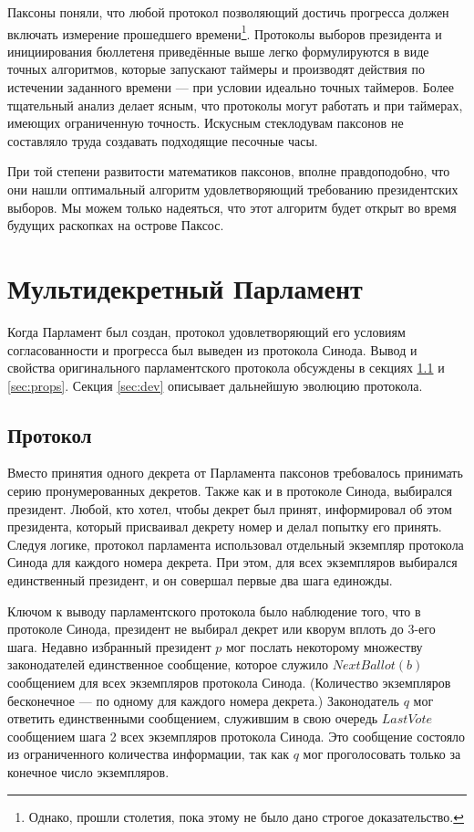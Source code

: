 \documentclass[12pt, a4paper]{article} %
\begin{document}
Паксоны поняли, что любой протокол позволяющий достичь прогресса должен включать измерение прошедшего времени\footnote{Однако, прошли столетия, пока этому не было дано строгое доказательство.}. Протоколы выборов президента и инициирования бюллетеня приведённые выше легко формулируются в виде точных алгоритмов, которые запускают таймеры и производят действия по истечении заданного времени --- при условии идеально точных таймеров. Более тщательный анализ делает ясным, что протоколы могут работать и при таймерах, имеющих ограниченную точность. Искусным стеклодувам паксонов не составляло труда создавать подходящие песочные часы. 

При той степени развитости математиков паксонов, вполне правдоподобно, что они нашли оптимальный алгоритм удовлетворяющий требованию президентских выборов. Мы можем только надеяться, что этот алгоритм будет открыт во время будущих раскопках на острове Паксос.

\newpage
\section{Мультидекретный Парламент}\label{sec:parlamentprot}

Когда Парламент был создан, протокол удовлетворяющий его условиям согласованности и прогресса был выведен из протокола Синода. Вывод и свойства оригинального парламентского протокола обсуждены в секциях \ref{sec:protocol} и \ref{sec:props}. Секция \ref{sec:dev} описывает дальнейшую эволюцию протокола.

\subsection{Протокол}\label{sec:protocol}

Вместо принятия одного декрета от Парламента паксонов требовалось принимать серию пронумерованных декретов. Также как и в протоколе Синода, выбирался президент. Любой, кто хотел, чтобы декрет был принят, информировал об этом президента, который присваивал декрету номер и делал попытку его принять. Следуя логике, протокол парламента использовал отдельный экземпляр протокола Синода для каждого номера декрета. При этом, для всех экземпляров выбирался единственный президент, и он совершал первые два шага единожды.

Ключом к выводу парламентского протокола было наблюдение того, что в протоколе Синода, президент не выбирал декрет или кворум вплоть до 3-его шага. Недавно избранный президент $p$ мог послать некоторому множеству законодателей единственное сообщение, которое служило $NextBallot(b)$ сообщением для всех экземпляров протокола Синода. (Количество экземпляров бесконечное --- по одному для каждого номера декрета.) Законодатель $q$ мог ответить единственными сообщением, служившим в свою очередь $LastVote$ сообщением шага 2 всех экземпляров протокола Синода. Это сообщение состояло из ограниченного количества информации, так как $q$ мог проголосовать только за конечное число экземпляров.
\end{document}
